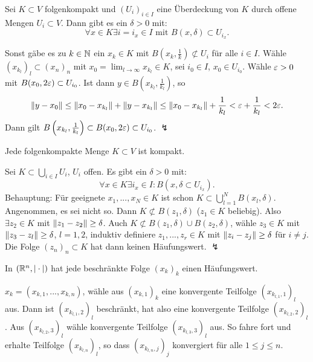 \begin{lemma}
	Sei $ K\subset V $ folgenkompakt und $ (U_i)_{i\in I} $ eine \"Uberdeckung von $ K $ durch offene Mengen $ U_i\subset V $. Dann gibt es ein $ \delta>0 $ mit:
	\[ \forall x\in K\exists i=i_x\in I\text{ mit }B(x,\delta)\subset U_{i_x}. \]
\end{lemma}
\begin{beweis}
	Sonst g\"abe es zu $ k\in\mathbb{N} $ ein $ x_k\in K $ mit $ B\left(x_k,\frac{1}{k}\right)\not\subset U_i $ f\"ur alle $ i\in I $. W\"ahle $ (x_{k_l})_l\subset (x_n)_n $ mit $ x_0=\lim_{l\to\infty}x_{k_l}\in K $, sei $ i_0\in I $, $ x_0\in U_{i_0} $. W\"ahle $ \varepsilon>0 $ mit $ B(x_0,2\varepsilon)\subset U_{i_0} $. Ist dann $ y\in B\left(x_{k_l},\frac{1}{k_l}\right) $, so
	\[ \left\|y-x_0\right\|\leq\left\|x_0-x_{k_l}\right\|+\left\|y-x_{k_l}\right\|\leq\left\|x_0-x_{k_l}\right\|+\frac{1}{k_l}<\varepsilon+\frac{1}{k_l}<2\varepsilon. \]
	Dann gilt $ B\left(x_{k_l},\frac{1}{k_l}\right)\subset B(x_0,2\varepsilon)\subset U_{i_0} $. $ \lightning $
\end{beweis}
\begin{satz}
	Jede folgenkompakte Menge $ K\subset V $ ist kompakt.
\end{satz}
\begin{beweis}
	Sei $ K\subset \bigcup_{i\in I}U_i $, $ U_i $ offen. Es gibt ein $ \delta>0 $ mit:
	\[ \forall x\in K\exists i_x\in I: B(x,\delta\subset U_{i_x}). \]
	Behauptung: F\"ur geeignete $ x_1,...,x_N\in K $ ist schon $ K\subset\bigcup_{l=1}^N B(x_l,\delta) $.\\
	Angenommen, es sei nicht so. Dann $ K\not\subset B(z_1,\delta) $ ($ z_1\in K $ beliebig). Also $ \exists z_2\in K $ mit $ \left\|z_1-z_2\right\|\geq\delta $. Auch $ K\not\subset B(z_1,\delta)\cup B(z_2,\delta) $, w\"ahle $ z_3\in K $ mit $ \left\|z_3-z_l\right\|\geq\delta $, $ l=1,2 $, induktiv definiere $ z_1,...,z_r\in K $ mit $ \left\|z_i-z_j\right\|\geq\delta $ f\"ur $ i\neq j $.\\
	Die Folge $ (z_n)_n\subset K $ hat dann keinen H\"aufungswert. $ \lightning $
\end{beweis}
\begin{satz}
	In $ (\mathbb{R}^n,|\cdot|) $ hat jede beschr\"ankte Folge $ (x_k)_k $ einen H\"aufungswert.
\end{satz}
\begin{beweis}
	$ x_k=(x_{k,1},...,x_{k,n}) $, w\"ahle aus $ (x_{k,1})_k $ eine konvergente Teilfolge $ (x_{k_{l,1},1})_l $ aus. Dann ist $ (x_{k_{l,1},2})_l $ beschr\"ankt, hat also eine konvergente Teilfolge $ (x_{k_{l,2},2})_l $. Aus $ (x_{k_{l,2},3})_l $ w\"ahle konvergente Teilfolge $ (x_{k_{l,3},3})_l $ aus. So fahre fort und erhalte Teilfolge $ (x_{k_{l,n}})_l $, so dass $ (x_{k_{l,n},j})_j $ konvergiert f\"ur alle $ 1\leq j\leq n $.
\end{beweis}

